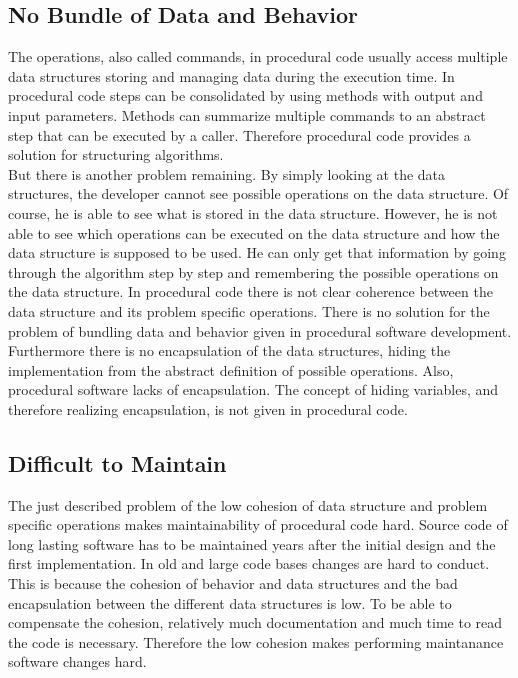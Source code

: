 \subsection*{No Bundle of Data and Behavior}
The operations, also called commands, in procedural code usually access multiple data structures storing and managing data during the execution time. In procedural code steps can be consolidated by using methods with output and input parameters. Methods can summarize multiple commands to an abstract step that can be executed by a caller. Therefore procedural code provides a solution for structuring algorithms.\\

But there is another problem remaining. By simply looking at the data structures, the developer cannot see possible operations on the data structure. Of course, he is able to see what is stored in the data structure. However, he is not able to see which operations can be executed on the data structure and how the data structure is supposed to be used. He can only get that information by going through the algorithm step by step and remembering the possible operations on the data structure. In procedural code there is not clear coherence between the data structure and its problem specific operations. There is no solution for the problem of bundling data and behavior given in procedural software development. \\

Furthermore there is no encapsulation of the data structures, hiding the implementation from the abstract definition of possible operations. Also, procedural software lacks of encapsulation. The concept of hiding variables, and therefore realizing encapsulation, is not given in procedural code. 

\subsection*{Difficult to Maintain}
\label{problem:maintainability}
The just described problem of the low cohesion of data structure and problem specific operations makes maintainability of procedural code hard. Source code of long lasting software has to be maintained years after the initial design and the first implementation. In old and large code bases changes are hard to conduct. This is because the cohesion of behavior and data structures and the bad encapsulation between the different data structures is low. To be able to compensate the cohesion, relatively much documentation and much time to read the code is necessary. Therefore the low cohesion makes performing maintanance software changes hard. 

